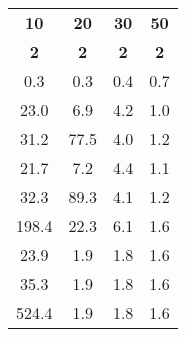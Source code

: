 \begin{tabular}{|c|c|c|c|}
\toprule
   \textbf{10} &   \textbf{20} &  \textbf{30} &  \textbf{50} \\
   \textbf{2}&   \textbf{2}&  \textbf{2}&  \textbf{2}\\
\midrule
  0.3 &  0.3 & 0.4 & 0.7 \\
 \cellcolor{\secondcolor}23.0 &  \cellcolor{\secondcolor}6.9 & 4.2 & \cellcolor{\firstcolor}1.0 \\
 31.2 & 77.5 & \cellcolor{\secondcolor}4.0 & 1.2 \\
 \cellcolor{\firstcolor}21.7 &  7.2 & 4.4 & \cellcolor{\secondcolor}1.1 \\
 32.3 & 89.3 & 4.1 & 1.2 \\
198.4 & 22.3 & 6.1 & 1.6 \\
 23.9 &  \cellcolor{\firstcolor}1.9 & \cellcolor{\firstcolor}1.8 & 1.6 \\
 35.3 &  \cellcolor{\firstcolor}1.9 & \cellcolor{\firstcolor}1.8 & 1.6 \\
524.4 &  \cellcolor{\firstcolor}1.9 & \cellcolor{\firstcolor}1.8 & 1.6 \\
\bottomrule
\end{tabular}
